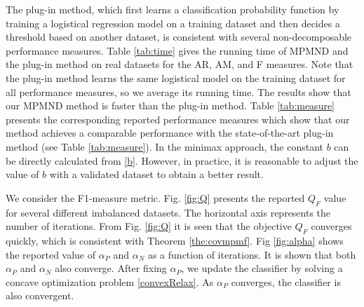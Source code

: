 \documentclass[15pt]{article}
\begin{document}
The plug-in method, which first learns a classification probability function by training a logistical regression 
model on a training dataset and then decides a threshold based on another dataset, is consistent with several 
non-decomposable performance measures.
Table \ref{tab:time} gives the running time of MPMND and the plug-in method on real datasets for the AR, AM, 
and F measures.
Note that the plug-in method learns the same logistical model on the training dataset for all performance 
measures, so we average its running time.
The results show that our MPMND method is faster than the plug-in method.
Table \ref{tab:measure} presents the corresponding reported performance measures which 
show that our method achieves a comparable performance with the state-of-the-art plug-in method 
(see Table \ref{tab:measure}).
In the minimax approach, the constant $b$ can be directly calculated from \eqref{b}.
However, in practice, it is reasonable to adjust the value of $b$ with a validated dataset 
to obtain a better result.

We consider the F1-measure metric. 
Fig. \ref{fig:Q} presents the reported $Q_F$ value for several different imbalanced datasets.
The horizontal axis represents the number of iterations. From Fig. \ref{fig:Q} it is seen that 
the objective $Q_F$ converges quickly, which is consistent with Theorem \ref{the:covmpmf}.
Fig \ref{fig:alpha} shows the reported value of $\alpha_P$ and $\alpha_N$ as a function of iterations.
It is shown that both $\alpha_P$ and $\alpha_N$ also converge.
After fixing $\alpha_P$, we update the classifier by solving a concave optimization problem \eqref{convexRelax}.
As $\alpha_P$ converges, the classifier is also convergent.
\end{document}
